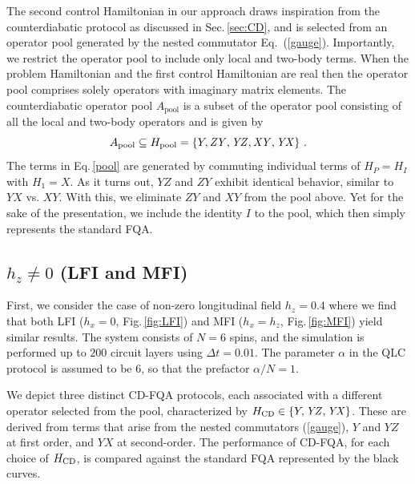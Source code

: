 \documentclass[twocolumn,aps,superscriptaddress,floatfix,longbibliography]{revtex4-2}
\newcommand{\Sec}[1]{Sec.\,\ref{#1}}
\newcommand{\Eq}[1]{Eq.\,\eqref{#1}}
\newcommand{\Fig}[1]{Fig.\,\ref{fig:#1}}
\def\YX{\ensuremath{\mathit{YX}}\xspace} %
\def\XY{\ensuremath{\mathit{XY}}\xspace}
\def\YZ{\ensuremath{\mathit{YZ}}\xspace}
\def\ZY{\ensuremath{\mathit{ZY}}\xspace}
\begin{document}
The second control Hamiltonian in our approach draws inspiration
from the counterdiabatic protocol as discussed in 
\Sec{sec:CD}, %
and is selected from an operator pool generated by the nested
commutator Eq.~(\ref{gauge}). Importantly, we restrict
the operator pool to include only local and two-body terms. When
the problem Hamiltonian and the first control Hamiltonian are
real then the operator pool comprises solely operators with imaginary matrix elements.
The counterdiabatic operator pool $A_{\text{pool}}$
is a subset of the operator pool consisting of all the local and
two-body operators and is given by
\begin{equation}
   A_{\rm pool}\subseteq 
   H_{\rm pool} = \{Y, \ZY, \YZ, \XY, \YX \}
\text{ .}\label{pool}
\end{equation}
The terms in \Eq{pool} are generated by commuting individual
terms of $H_P = H_I$ with $H_1=X$. As it turns out, %
\YZ and \ZY exhibit identical behavior,
similar to \YX vs. \XY. %
With this, we eliminate \ZY and \XY from the pool above.
Yet for the sake of the presentation, we include the
identity $I$ to the pool, which then simply represents
the standard FQA.

\subsection{$h_z\neq 0$ (LFI and MFI)}
First, we consider the case of non-zero
longitudinal field %
$h_z = 0.4$ where we find that both LFI ($h_x=0$, \Fig{LFI})
and MFI ($h_x=h_z$, \Fig{MFI}) yield
similar results.
The system consists of $N=6$ spins, 
and the simulation is performed up to $200$
circuit layers using %
$\Delta t=0.01$. The parameter $\alpha$ in the QLC protocol is assumed to be $6$, so that the prefactor $\alpha/N=1$. 

We depict three distinct CD-FQA protocols, each associated with
a different operator selected from the pool, characterized by
$H_{\rm CD} \in %
\{ Y, \YZ, \YX \}$. These %
are derived from terms that arise from
the nested commutators (\ref{gauge}),
$Y$ and \YZ at %
first order, and %
\YX at %
second-order. %
The performance of CD-FQA, for each choice of $H_{\rm CD}$,
is compared against the standard FQA represented by the black
curves. 
\end{document}
